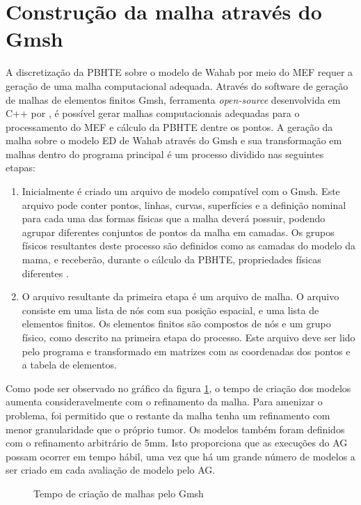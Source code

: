 \section{Construção da malha através do Gmsh}
\label{sec:gmshgen}
A discretização da PBHTE sobre o modelo de Wahab por meio do MEF requer a geração de uma malha computacional adequada. Através do software de geração de malhas de elementos finitos Gmsh, ferramenta \textit{open-source} desenvolvida em C++ por , é possível gerar malhas computacionais adequadas para o processamento do MEF e cálculo da PBHTE dentre os pontos. A geração da malha sobre o modelo ED de Wahab através do Gmsh e sua transformação em malhas dentro do programa principal é um processo dividido nas seguintes etapas:

\begin{enumerate}
    \item Inicialmente é criado um arquivo de modelo compatível com o Gmsh. Este arquivo pode conter pontos, linhas, curvas, superfícies e a definição nominal para cada uma das formas físicas que a malha deverá possuir, podendo agrupar diferentes conjuntos de pontos da malha em camadas. Os grupos físicos resultantes deste processo são definidos como as camadas do modelo da mama, e receberão, durante o cálculo da PBHTE, propriedades físicas diferentes \cite[p. 8-9]{avdis2012gmsh}.
    
    \item O arquivo resultante da primeira etapa é um arquivo de malha. O arquivo consiste em uma lista de nós com sua posição espacial, e uma lista de elementos finitos. Os elementos finitos são compostos de nós e um grupo físico, como descrito na primeira etapa do processo. Este arquivo deve ser lido pelo programa e transformado em matrizes com as coordenadas dos pontos e a tabela de elementos.
\end{enumerate}
 

Como pode ser observado no gráfico da figura \ref{fig:time}, o tempo de criação dos modelos aumenta consideravelmente com o refinamento da malha. Para amenizar o problema, foi permitido que o restante da malha tenha um refinamento com menor granularidade que o próprio tumor. Os modelos também foram definidos com o refinamento arbitrário de 5mm. Isto proporciona que as execuções do AG possam ocorrer em tempo hábil, uma vez que há um grande número de modelos a ser criado em cada avaliação de modelo pelo AG.

\begin{figure}[!ht]
\centering
\pgfplotsset{compat=1.8}
\caption{Tempo de criação de malhas pelo Gmsh}\label{fig:time}
\end{figure}

